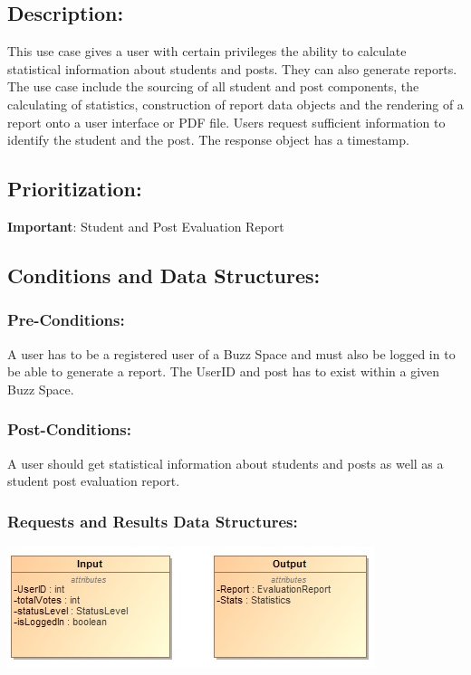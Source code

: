\documentclass[a4paper,11pt]{article}
\begin{document}
\subsection*{Description:}
This use case gives a user with certain privileges the ability to calculate statistical information about students and posts. They can also generate reports. The use case include the sourcing of all student and post components, the calculating of statistics, construction of report data objects and the rendering of a report onto a user interface or PDF file. Users request sufficient information to identify the student and the post. The response object has a timestamp.
\subsection{Prioritization:} 
\textbf{Important}: Student and Post Evaluation Report
\subsection{Conditions and Data Structures:}
\subsubsection*{Pre-Conditions:}
A user has to be a registered user of a Buzz Space and must also be logged in to be able to generate a report. The UserID and post has to exist within a given Buzz Space.\\
\subsubsection*{Post-Conditions:}
A user should get statistical information about students and posts as well as a student post evaluation report.\\
\subsubsection*{Requests and Results Data Structures:}
\includegraphics{Images/Report/Input&Output}
\end{document}
